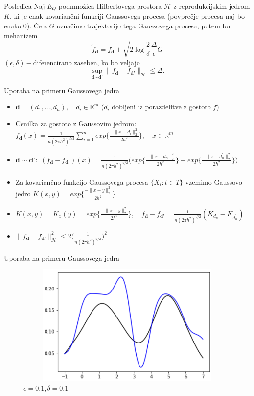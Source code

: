 \documentclass{beamer}
\begin{document}
\begin{frame}
\begin{block}{Posledica}
Naj $E_Q$  podmnožica Hilbertovega prostora $\mathcal{H}$ z reprodukcijskim jedrom $K$, ki je enak kovariančni funkciji Gaussovega procesa (povprečje procesa naj bo enako 0). Če z $G$ označimo trajektorijo tega Gaussovega procesa, potem bo mehanizem 
$$
\widetilde{f}_{\textbf{d}} = f_{\textbf{d}} + \sqrt{2\log{\frac{2}{\delta}}} \frac{\Delta}{\epsilon}G
$$
$(\epsilon,\delta)-$diferencirano zaseben, ko bo veljajo 
$$
\sup_{\textbf{d} \sim \textbf{d'}} \| f_{\textbf{d}} -  f_{\textbf{d'}} \|_{\mathcal{H}} \leq \Delta.
$$
\end{block}
\end{frame}

\begin{frame}{Uporaba na primeru Gaussovega jedra}
\begin{itemize}
\item $\textbf{d} = (d_1,...,d_n), \quad d_i \in \mathbb{R}^m$ ($d_i$ dobljeni iz porazdelitve z gostoto $f$)
\item Cenilka za gostoto z Gaussovim jedrom: $f_{\textbf{d}}(x) = \frac{1}{n(2\pi h^2)^{d/2}} \sum_{i=1}^{n} exp\Big\{\frac{-\|x-d_i\|_{2}^{2}}{2h^2}\Big\},  \quad x \in \mathbb{R}^m$
\item $\textbf{d} \sim \textbf{d'}:$ $
(f_{\textbf{d}} - f_{\textbf{d'}})(x) = \frac{1}{n(2\pi h^2)^{d/2}} \Big(exp\Big\{\frac{-\|x-d_n\|_{2}^{2}}{2h^2}\Big\}-exp\Big\{\frac{-\|x-d_{n}^{\prime}\|_{2}^{2}}{2h^2}\Big\}\Big)
$
\item Za kovariančno funkcijo Gaussovega procesa $\{X_t : t \in T \}$ vzemimo Gaussovo jedro $K(x,y) = exp\{\frac{-\|x-y\|_{2}^{2}}{2h^2}\}$
\item $K(x,y) = K_x(y) = exp\{\frac{-\|x-y\|_{2}^{2}}{2h^2}\}, \quad f_{\textbf{d}} - f_{\textbf{d'}} = \frac{1}{n(2\pi h^2)^{d/2}} (K_{d_n}-K_{d_{n}^{\prime}})$
\item $\|f_{\textbf{d}} - f_{\textbf{d'}}\|_{\mathcal{H}}^{2} \leq  2 \Big(\frac{1}{n(2\pi h^2)^{d/2}}\Big)^2$
\end{itemize}
\end{frame}

\begin{frame}{Uporaba na primeru Gaussovega jedra}
\begin{figure}
\centering
\includegraphics[width = 12cm, height = 6cm]{prva}
\caption{$\epsilon = 0.1, \delta = 0.1$}
\end{figure}

\end{frame}
\end{document}
